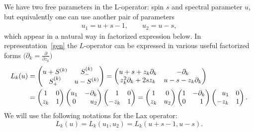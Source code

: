 \documentclass[10pt,a4paper]{amsart}
\numberwithin{equation}{section}
\begin{document}
We have two free parameters in the L-operator:
spin $s$ and spectral parameter $u$, but equivalently
one can use another pair of parameters
\begin{align*}
u_1 = u+s-1,\qquad u_2 = u - s,
\end{align*}
which appear in a natural way in factorized expression below.
In representation~\eqref{gen} the $L$-operator can be
expressed in various useful factorized forms
$\bigl(\partial_k = \frac{\partial}{\partial z_k}\bigr)$
\begin{align}
\nonumber
L_k(u) & =
\begin{pmatrix}
u + S^{(k)} & S_{-}^{(k)} \\
S_{+}^{(k)} & u - S^{(k)} \end{pmatrix} =
\begin{pmatrix} u+s+z_k \partial_k & -\partial_k\\
z_k^2 \partial_k + 2s z_k & u-s-z_k
\partial_k
\end{pmatrix}
\\
\label{Lfac}
&=
\begin{pmatrix}
 1 & 0 \\
 z_k & 1 \\
\end{pmatrix}
\begin{pmatrix}
 u_1 & -\partial_{k} \\
 0 & \hphantom{-} u_2 \\
\end{pmatrix}
\begin{pmatrix}
 \hphantom{-}1 & 0 \\
 -z_k & 1 \\
\end{pmatrix} =
\begin{pmatrix}
 1 & 0 \\
 z_k & u_2 \\
\end{pmatrix}
\begin{pmatrix}
 1 & -\partial_{k} \\
 0 & \hphantom{-}1 \\
\end{pmatrix}
\begin{pmatrix}
 \hphantom{-}u_1 & 0 \\
 -z_k & 1 \\
\end{pmatrix}.
\end{align}
We will use the following notations for
the Lax operator:
\begin{equation*}
L_k(u) = L_k(u_1 ,u_2) =
L_k(u+s-1 ,u - s) .
\end{equation*}
\end{document}
